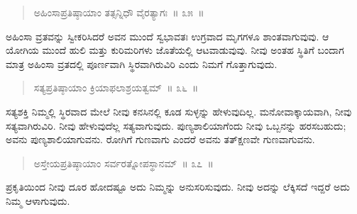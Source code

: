 \vspace{-0.2cm}

\begin{verse}
ಅಹಿಂಸಾಪ್ರತಿಷ್ಠಾಯಾಂ ತತ್ಸನ್ನಿಧೌ ವೈರತ್ಯಾಗಃ~॥ ೩೫~॥
\end{verse}

\vspace{-0.4cm}


\vspace{0.1cm}

ಅಹಿಂಸಾ ವ್ರತವನ್ನು ಸ್ವೀಕರಿಸಿದರೆ ಅವನ ಮುಂದೆ ಸ್ವಭಾವತಃ ಉಗ್ರವಾದ ಮೃಗಗಳೂ ಶಾಂತವಾಗುವುವು. ಆ ಯೋಗಿಯ ಮುಂದೆ ಹುಲಿ ಮತ್ತು ಕುರಿಮರಿಗಳು ಜೊತೆಯಲ್ಲಿ ಆಟವಾಡುವುವು. ನೀವು ಅಂತಹ ಸ್ಥಿತಿಗೆ ಬಂದಾಗ ಮಾತ್ರ ಅಹಿಂಸಾ ವ್ರತದಲ್ಲಿ ಪೂರ್ಣವಾಗಿ ಸ್ಥಿರವಾಗಿರುವಿರಿ ಎಂದು ನಿಮಗೆ ಗೊತ್ತಾಗುವುದು. 

\vspace{-0.2cm}

\begin{verse}
ಸತ್ಯಪ್ರತಿಷ್ಠಾಯಾಂ ಕ್ರಿಯಾಫಲಾಶ್ರಯತ್ವಮ್​~॥ ೩೬~॥
\end{verse}

\vspace{-0.4cm}


\vspace{0.2cm}

ಸತ್ಯಶಕ್ತಿ ನಿಮ್ಮಲ್ಲಿ ಸ್ಥಿರವಾದ ಮೇಲೆ ನೀವು ಕನಸಿನಲ್ಲಿ ಕೂಡ ಸುಳ್ಳನ್ನು ಹೇಳುವುದಿಲ್ಲ. ಮನೋವಾಕ್ಕಾಯವಾಗಿ, ನೀವು ಸತ್ಯವಾಗಿರುವಿರಿ. ನೀವು ಹೇಳುವುದೆಲ್ಲ ಸತ್ಯವಾಗುವುದು. ಪುಣ್ಯಶಾಲಿಯಾಗೆಂದು ನೀವು ಒಬ್ಬನನ್ನು ಹರಸಬಹುದು; ಅವನು ಪುಣ್ಯಶಾಲಿಯಾಗುವನು. ರೋಗಿಗೆ ಗುಣವಾಗು ಎಂದರೆ ಅವನು ತತ್​ಕ್ಷಣವೇ ಗುಣವಾಗುವನು. 

\vspace{-0.2cm}

\begin{verse}
ಅಸ್ತೇಯಪ್ರತಿಷ್ಠಾಯಾಂ ಸರ್ವರತ್ನೋಪಸ್ಥಾನಮ್​~॥ ೩೭~॥
\end{verse}

\vspace{-0.45cm}


\vspace{0.2cm}

ಪ್ರಕೃತಿಯಿಂದ ನೀವು ದೂರ ಹೋದಷ್ಟೂ ಅದು ನಿಮ್ಮನ್ನು ಅನುಸರಿಸುವುದು. ನೀವು ಅದನ್ನು ಲೆಕ್ಕಿಸದೆ ಇದ್ದರೆ ಅದು ನಿಮ್ಮ ಆಳಾಗುವುದು. 

\eject

